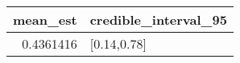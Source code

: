 \begin{longtable}{rl}
\toprule
mean\_est & credible\_interval\_95 \\ 
\midrule
0.4361416 & [0.14,0.78] \\ 
\bottomrule
\end{longtable}

